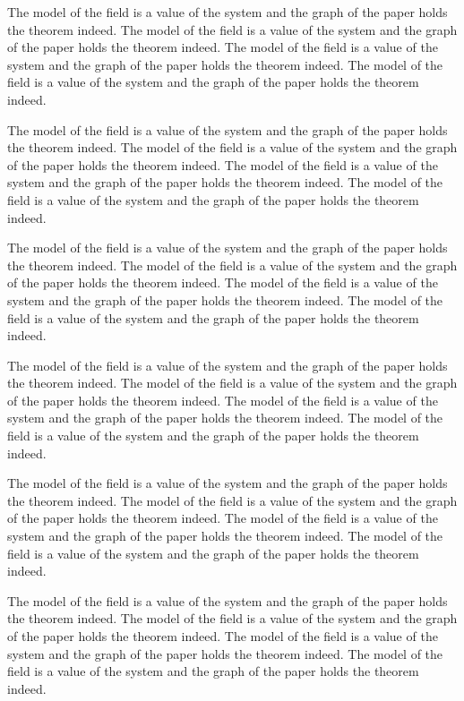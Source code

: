 \documentclass{article}
\begin{document}
The model of the field is a value of the system and the graph of the paper holds the theorem indeed. The model of the field is a value of the system and the graph of the paper holds the theorem indeed. The model of the field is a value of the system and the graph of the paper holds the theorem indeed. The model of the field is a value of the system and the graph of the paper holds the theorem indeed.

The model of the field is a value of the system and the graph of the paper holds the theorem indeed. The model of the field is a value of the system and the graph of the paper holds the theorem indeed. The model of the field is a value of the system and the graph of the paper holds the theorem indeed. The model of the field is a value of the system and the graph of the paper holds the theorem indeed.

The model of the field is a value of the system and the graph of the paper holds the theorem indeed. The model of the field is a value of the system and the graph of the paper holds the theorem indeed. The model of the field is a value of the system and the graph of the paper holds the theorem indeed. The model of the field is a value of the system and the graph of the paper holds the theorem indeed.

The model of the field is a value of the system and the graph of the paper holds the theorem indeed. The model of the field is a value of the system and the graph of the paper holds the theorem indeed. The model of the field is a value of the system and the graph of the paper holds the theorem indeed. The model of the field is a value of the system and the graph of the paper holds the theorem indeed.

The model of the field is a value of the system and the graph of the paper holds the theorem indeed. The model of the field is a value of the system and the graph of the paper holds the theorem indeed. The model of the field is a value of the system and the graph of the paper holds the theorem indeed. The model of the field is a value of the system and the graph of the paper holds the theorem indeed.

The model of the field is a value of the system and the graph of the paper holds the theorem indeed. The model of the field is a value of the system and the graph of the paper holds the theorem indeed. The model of the field is a value of the system and the graph of the paper holds the theorem indeed. The model of the field is a value of the system and the graph of the paper holds the theorem indeed.
\end{document}
